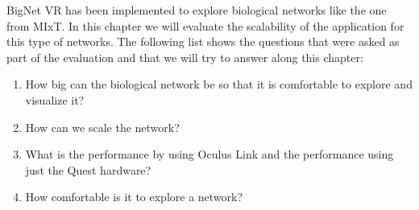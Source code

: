 


BigNet VR has been implemented to explore biological networks like the one from MIxT. In this chapter we will evaluate the scalability of the application for this type of networks. The following list shows the questions that were asked as part of the evaluation and that we will try to answer along this chapter:
\begin{enumerate}
  \item How big can the biological network be so that it is comfortable to explore and visualize it?
  \item How can we scale the network?
  \item What is the performance by using Oculus Link and the performance using just the Quest hardware?
  \item How comfortable is it to explore a network?
\end{enumerate}

